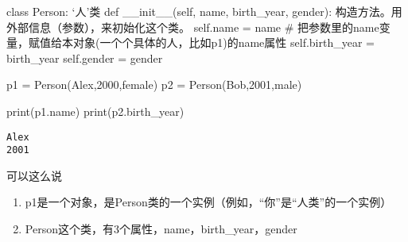 \documentclass[
  letterpaper,
  DIV=11,
  numbers=noendperiod]{scrreprt}
\newenvironment{Shaded}{\begin{snugshade}}{\end{snugshade}}
\newcommand{\BuiltInTok}[1]{\textcolor[rgb]{0.00,0.23,0.31}{#1}}
\newcommand{\CommentTok}[1]{\textcolor[rgb]{0.37,0.37,0.37}{#1}}
\newcommand{\DecValTok}[1]{\textcolor[rgb]{0.68,0.00,0.00}{#1}}
\newcommand{\FunctionTok}[1]{\textcolor[rgb]{0.28,0.35,0.67}{#1}}
\newcommand{\KeywordTok}[1]{\textcolor[rgb]{0.00,0.23,0.31}{#1}}
\newcommand{\NormalTok}[1]{\textcolor[rgb]{0.00,0.23,0.31}{#1}}
\newcommand{\OperatorTok}[1]{\textcolor[rgb]{0.37,0.37,0.37}{#1}}
\newcommand{\StringTok}[1]{\textcolor[rgb]{0.13,0.47,0.30}{#1}}
\newcommand{\VariableTok}[1]{\textcolor[rgb]{0.07,0.07,0.07}{#1}}
\providecommand{\tightlist}{%
  \setlength{\itemsep}{0pt}\setlength{\parskip}{0pt}}\usepackage{longtable,booktabs,array}
\begin{document}
\begin{Shaded}
\begin{Highlighting}[]
\KeywordTok{class}\NormalTok{ Person:}
    \CommentTok{\textquotesingle{}\textquotesingle{}\textquotesingle{}}
\CommentTok{    ‘人’类}
\CommentTok{    \textquotesingle{}\textquotesingle{}\textquotesingle{}}
    \KeywordTok{def} \FunctionTok{\_\_init\_\_}\NormalTok{(}\VariableTok{self}\NormalTok{, name, birth\_year, gender):}
        \CommentTok{\textquotesingle{}\textquotesingle{}\textquotesingle{}}
\CommentTok{        构造方法。用外部信息（参数），来初始化这个类。}
\CommentTok{        \textquotesingle{}\textquotesingle{}\textquotesingle{}}
        \VariableTok{self}\NormalTok{.name }\OperatorTok{=}\NormalTok{ name }
        \CommentTok{\# 把参数里的name变量，赋值给本对象(一个个具体的人，比如p1)的name属性}
        \VariableTok{self}\NormalTok{.birth\_year }\OperatorTok{=}\NormalTok{ birth\_year}
        \VariableTok{self}\NormalTok{.gender }\OperatorTok{=}\NormalTok{ gender}
\end{Highlighting}
\end{Shaded}

\begin{Shaded}
\begin{Highlighting}[]
\NormalTok{p1 }\OperatorTok{=}\NormalTok{ Person(}\StringTok{\textquotesingle{}Alex\textquotesingle{}}\NormalTok{,}\DecValTok{2000}\NormalTok{,}\StringTok{\textquotesingle{}female\textquotesingle{}}\NormalTok{)}
\NormalTok{p2 }\OperatorTok{=}\NormalTok{ Person(}\StringTok{\textquotesingle{}Bob\textquotesingle{}}\NormalTok{,}\DecValTok{2001}\NormalTok{,}\StringTok{\textquotesingle{}male\textquotesingle{}}\NormalTok{)}

\BuiltInTok{print}\NormalTok{(p1.name)}
\BuiltInTok{print}\NormalTok{(p2.birth\_year)}
\end{Highlighting}
\end{Shaded}

\begin{verbatim}
Alex
2001
\end{verbatim}

可以这么说

\begin{enumerate}
\def\labelenumi{\arabic{enumi}.}
\tightlist
\item
  p1是一个对象，是Person类的一个实例（例如，``你''是``人类''的一个实例）
\item
  Person这个类，有3个属性，name，birth\_year，gender
\end{enumerate}
\end{document}
